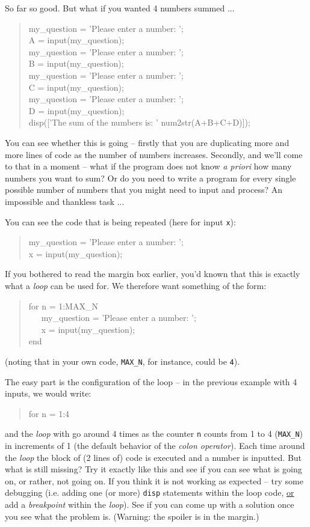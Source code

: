 \documentclass{tufte-book} %
\newenvironment{docspec}{\begin{quotation}\ttfamily\parskip0pt\parindent0pt\ignorespaces}{\end{quotation}}
\begin{document}
So far so good. But what if you wanted 4 numbers summed ...
\begin{docspec}
my\_question = 'Please enter a number: ';
\\A = input(my\_question);
\\my\_question = 'Please enter a number: ';
\\B = input(my\_question);
\\my\_question = 'Please enter a number: ';
\\C = input(my\_question);
\\my\_question = 'Please enter a number: ';
\\D = input(my\_question);
\\disp(['The sum of the numbers is:  ' num2str(A+B+C+D)]);
\end{docspec}

You can see whether this is going -- firstly that you are duplicating more and more lines of code as the number of numbers increases. Secondly, and we'll come to that in a moment -- what if the program does not know \textit{a priori} how many numbers you want to sum? Or do you need to write a program for every single possible number of numbers that you might need to input and process? An impossible and thankless task ...

You can see the code that is being repeated (here for input \texttt{x}):
\begin{docspec}
my\_question = 'Please enter a number: ';
\\x = input(my\_question);
\end{docspec}

If you bothered to read the margin box earlier, you'd known that this is exactly what a \textit{loop} can be used for. We therefore want something of the form:
\begin{docspec}
for n = 1:MAX\_N
\\ \ \ \ my\_question = 'Please enter a number: ';
\\ \ \ \ x = input(my\_question);
\\end
\end{docspec}

\noindent (noting that in your own code, \texttt{MAX\_N}, for instance, could be \texttt{4}).

The easy part is the configuration of the loop -- in the previous example with 4 inputs, we would write:
\begin{docspec}
for n = 1:4
\end{docspec}
and the \textit{loop} with go around 4 times as the counter \texttt{n} counts from 1 to 4 (\texttt{MAX\_N}) in increments of 1 (the default behavior of the \textit{colon operator}). Each time around the \textit{loop} the block of (2 lines of) code is executed and a number is inputted. But what is still missing? Try it exactly like this and see if you can see what is going on, or rather, not going on. If you think it is not working as expected -- try some debugging (i.e. adding one (or more) \texttt{disp} statements within the loop code, \uline{or} add a \textit{breakpoint} within the \textit{loop}).  See if you can come up with a solution once you see what the problem is. (Warning: the spoiler is in the margin.)
\end{document}

